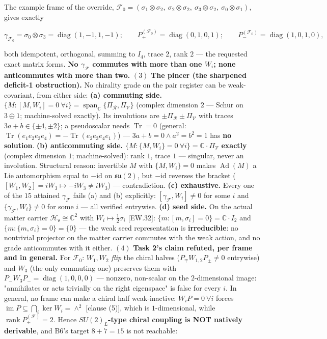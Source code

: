 \begin{theorem}
The example frame of the override, $\mathcal F_0=(\sigma_1\otimes\sigma_2,\ \sigma_2\otimes\sigma_2,\ \sigma_3\otimes\sigma_2,\ \sigma_0\otimes\sigma_1)$, gives exactly

\[
\gamma_{\mathcal F_0}=\sigma_0\otimes\sigma_3=\operatorname{diag}(1,-1,1,-1);\qquad
P^{(\mathcal F_0)}_+=\operatorname{diag}(0,1,0,1);\qquad
P^{(\mathcal F_0)}_-=\operatorname{diag}(1,0,1,0),
\]

both idempotent, orthogonal, summing to $I_4$, trace $2$, rank $2$ — the requested exact matrix forms. \textbf{No $\gamma_{\mathcal F}$ commutes with more than one $W_i$; none anticommutes with more than two.} $(3)$ \textbf{The pincer (the sharpened deficit-1 obstruction).} No chirality grade on the pair register can be weak-covariant, from either side: \textbf{(a) commuting side.} $\{M:[M,W_i]=0\ \forall i\}=\operatorname{span}_{\mathbb C}\{\Pi_{\mathcal R},\Pi_{\mathcal V}\}$ (complex dimension $2$ — Schur on $3\oplus1$; machine-solved exactly). Its involutions are $\pm\Pi_{\mathcal R}\pm\Pi_{\mathcal V}$ with traces $3a+b\in\{\pm4,\pm2\}$; a pseudoscalar needs $\operatorname{Tr}=0$ (general: $\operatorname{Tr}(e_1e_2e_3e_4)=-\operatorname{Tr}(e_2e_3e_4e_1)$) — $3a+b=0\wedge a^2=b^2=1$ has \textbf{no solution}. \textbf{(b) anticommuting side.} $\{M:\{M,W_i\}=0\ \forall i\}=\mathbb C\cdot\Pi_{\mathcal V}$ \textbf{exactly} (complex dimension $1$; machine-solved): rank $1$, trace $1$ — singular, never an involution. Structural reason: invertible $M$ with $\{M,W_i\}=0$ makes $\operatorname{Ad}(M)$ a Lie automorphism equal to $-\mathrm{id}$ on $\mathfrak{su}(2)$, but $-\mathrm{id}$ reverses the bracket ($[W_1,W_2]=iW_3\mapsto-iW_3\ne iW_3$) — contradiction. \textbf{(c) exhaustive.} Every one of the $15$ attained $\gamma_{\mathcal F}$ fails (a) and (b) explicitly: $[\gamma_{\mathcal F},W_i]\ne0$ for some $i$ and $\{\gamma_{\mathcal F},W_i\}\ne0$ for some $i$ — all verified entrywise. \textbf{(d) seed side.} On the actual matter carrier $\mathcal H_{\mathsf v}\cong\mathbb C^2$ with $W_i\mapsto\tfrac12\sigma_i$ [EW.32]: $\{m:[m,\sigma_i]=0\}=\mathbb C\cdot I_2$ and $\{m:\{m,\sigma_i\}=0\}=\{0\}$ — the weak seed representation is \textbf{irreducible}: no nontrivial projector on the matter carrier commutes with the weak action, and no grade anticommutes with it either. $(4)$ \textbf{Task 2's claim refuted, per frame and in general.} For $\mathcal F_0$: $W_1,W_2$ \textit{flip} the chiral halves ($P_\mp W_{1,2}P_\pm\ne0$ entrywise) and $W_3$ (the only commuting one) preserves them with $P_-W_3P_-=\operatorname{diag}(1,0,0,0)$ — nonzero, non-scalar on the $2$-dimensional image: "annihilates or acts trivially on the right eigenspace" is false for every $i$. In general, no frame can make a chiral half weak-inactive: $W_iP=0\ \forall i$ forces $\operatorname{im}P\subseteq\bigcap_i\ker W_i=\wedge^2$ [clause (5)], which is $1$-dimensional, while $\operatorname{rank}P^{(\mathcal F)}_\pm=2$. Hence \textbf{$SU(2)_L$-type chiral coupling is NOT natively derivable}, and B6's target $8+7=15$ is not reachable: 
\end{theorem}
